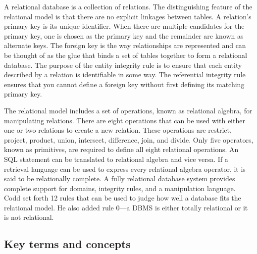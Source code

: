 \documentclass[
]{article}
\begin{document}
A relational database is a collection of relations. The distinguishing
feature of the relational model is that there are no explicit linkages
between tables. A relation's primary key is its unique identifier. When
there are multiple candidates for the primary key, one is chosen as the
primary key and the remainder are known as alternate keys. The foreign
key is the way relationships are represented and can be thought of as
the glue that binds a set of tables together to form a relational
database. The purpose of the entity integrity rule is to ensure that
each entity described by a relation is identifiable in some way. The
referential integrity rule ensures that you cannot define a foreign key
without first defining its matching primary key.

The relational model includes a set of operations, known as relational
algebra, for manipulating relations. There are eight operations that can
be used with either one or two relations to create a new relation. These
operations are restrict, project, product, union, intersect, difference,
join, and divide. Only five operators, known as primitives, are required
to define all eight relational operations. An SQL statement can be
translated to relational algebra and vice versa. If a retrieval language
can be used to express every relational algebra operator, it is said to
be relationally complete. A fully relational database system provides
complete support for domains, integrity rules, and a manipulation
language. Codd set forth 12 rules that can be used to judge how well a
database fits the relational model. He also added rule 0---a DBMS is
either totally relational or it is not relational.

\hypertarget{key-terms-and-concepts-6}{%
\subsection*{Key terms and concepts}\label{key-terms-and-concepts-6}}
\end{document}
